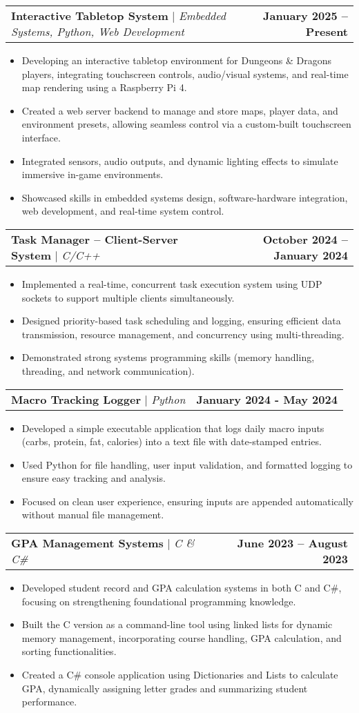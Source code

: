 \documentclass[letterpaper,11pt]{article}
\makeatletter
\newcommand{\resumeItem}[1]{
  \item\small{
    {#1 \vspace{-2pt}}
  }
}
\newcommand{\resumeProjectHeading}[2]{
    \item
    \begin{tabular*}{1.001\textwidth}{l@{\extracolsep{\fill}}r}
      \small#1 & \textbf{\small #2}\\
    \end{tabular*}\vspace{-7pt}
}
\newcommand{\resumeItemListStart}{\begin{itemize}}
\newcommand{\resumeItemListEnd}{\end{itemize}\vspace{-5pt}}
\makeatother
\begin{document}
\resumeProjectHeading
    {\textbf{Interactive Tabletop System} $|$ \emph{Embedded Systems, Python, Web Development}}{January 2025 – Present}
    \resumeItemListStart
        \resumeItem{Developing an interactive tabletop environment for Dungeons \& Dragons players, integrating touchscreen controls, audio/visual systems, and real-time map rendering using a Raspberry Pi 4.}
        \resumeItem{Created a web server backend to manage and store maps, player data, and environment presets, allowing seamless control via a custom-built touchscreen interface.}
        \resumeItem{Integrated sensors, audio outputs, and dynamic lighting effects to simulate immersive in-game environments.}
        \resumeItem{Showcased skills in embedded systems design, software-hardware integration, web development, and real-time system control.}
    \resumeItemListEnd
\vspace{-13pt}

\resumeProjectHeading
    {\textbf{Task Manager – Client-Server System} $|$ \emph{C/C++}}{ October 2024 – January 2024}
    \resumeItemListStart
        \resumeItem{Implemented a real-time, concurrent task execution system using UDP sockets to support multiple clients simultaneously.}\vspace{-13pt}
        \resumeItem{Designed priority-based task scheduling and logging, ensuring efficient data transmission, resource management, and concurrency using multi-threading.}
        \resumeItem{Demonstrated strong systems programming skills (memory handling, threading, and network communication).}
    \resumeItemListEnd
\vspace{-13pt}

\resumeProjectHeading
    {\textbf{Macro Tracking Logger} $|$ \emph{Python}}{January 2024 - May 2024}
    \resumeItemListStart
        \resumeItem{Developed a simple executable application that logs daily macro inputs (carbs, protein, fat, calories) into a text file with date-stamped entries.}
        \resumeItem{Used Python for file handling, user input validation, and formatted logging to ensure easy tracking and analysis.}
        \resumeItem{Focused on clean user experience, ensuring inputs are appended automatically without manual file management.}
    \resumeItemListEnd
\vspace{-13pt}

\resumeProjectHeading
    {\textbf{GPA Management Systems} $|$ \emph{C \& C\#}}{June 2023 – August 2023}
    \resumeItemListStart
        \resumeItem{Developed student record and GPA calculation systems in both C and C\#, focusing on strengthening foundational programming knowledge.}
        \resumeItem{Built the C version as a command-line tool using linked lists for dynamic memory management, incorporating course handling, GPA calculation, and sorting functionalities.}
        \resumeItem{Created a C\# console application using Dictionaries and Lists to calculate GPA, dynamically assigning letter grades and summarizing student performance.}
    \resumeItemListEnd
\vspace{-13pt}
\end{document}
